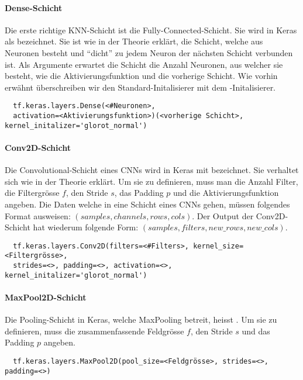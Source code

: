 \paragraph{Dense-Schicht}
Die erste richtige KNN-Schicht ist die Fully-Connected-Schicht. Sie wird in
Keras als  bezeichnet. Sie ist wie in
der Theorie erklärt, die Schicht, welche aus Neuronen besteht und ``dicht'' zu jedem
Neuron der nächsten Schicht verbunden ist.
Als Argumente erwartet die Schicht die Anzahl Neuronen, aus welcher sie besteht,
wie die Aktivierungsfunktion und die vorherige Schicht. Wie vorhin erwähnt
überschreiben wir den Standard-Initalisierer mit dem -Initalisierer.
\begin{verbatim}
  tf.keras.layers.Dense(<#Neuronen>,
  activation=<Aktivierungsfunktion>)(<vorherige Schicht>, kernel_initalizer='glorot_normal')
\end{verbatim}


\paragraph{Conv2D-Schicht}
Die Convolutional-Schicht eines CNNs wird in Keras mit 
bezeichnet. Sie verhaltet sich wie in der Theorie erklärt. Um sie zu definieren,
muss man die Anzahl Filter, die Filtergrösse $f$, den Stride $s$, das Padding
$p$ und die Aktivierungsfunktion angeben.
Die Daten welche in eine Schicht eines CNNs gehen, müssen
folgendes Format ausweisen: $(samples, channels, rows, cols)$. Der Output der
Conv2D-Schicht hat wiederum folgende Form: $(samples, filters, new\_rows, new\_cols)$.
\begin{verbatim}
  tf.keras.layers.Conv2D(filters=<#Filters>, kernel_size=<Filtergrösse>,
  strides=<>, padding=<>, activation=<>, kernel_initalizer='glorot_normal')
\end{verbatim}

\paragraph{MaxPool2D-Schicht}
Die Pooling-Schicht in Keras, welche MaxPooling betreit, heisst
. Um sie zu definieren, muss die zusammenfassende Feldgrösse
$f$, den Stride $s$ und das Padding $p$ angeben.

\begin{verbatim}
  tf.keras.layers.MaxPool2D(pool_size=<Feldgrösse>, strides=<>, padding=<>)
\end{verbatim}

